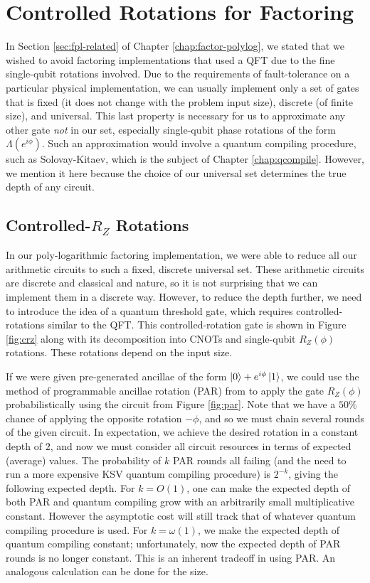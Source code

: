 \section{Controlled Rotations for Factoring}
\label{sec:fsl-qcompile}

In Section \ref{sec:fpl-related} of Chapter \ref{chap:factor-polylog}, we stated that we wished to avoid
factoring implementations that used a QFT due to the fine
single-qubit rotations involved. Due to the requirements of
fault-tolerance on a particular physical implementation,
we can usually implement only a set of gates that is fixed
(it does not change with the problem input size), discrete (of finite size),
and universal. This last property is necessary for us to approximate any
other gate \emph{not} in our set, especially single-qubit phase rotations
of the form $\Lambda(e^{i \phi})$. Such an approximation would involve
a quantum compiling procedure, such as Solovay-Kitaev, which is the
subject of Chapter \ref{chap:qcompile}. However, we mention it here
because the choice of our universal set determines the true depth
of any circuit.

\subsection{Controlled-$R_Z$ Rotations}

In our poly-logarithmic factoring implementation, we were able to reduce
all our arithmetic circuits to such a fixed, discrete universal set.
These arithmetic circuits are discrete and classical and nature, so it is
not surprising that we can implement them in a discrete way.
However, to reduce the depth further, we need to introduce the idea of
a quantum threshold gate, which requires controlled-rotations similar to
the QFT. This controlled-rotation gate is shown in Figure \ref{fig:crz}
along with its decomposition into CNOTs and single-qubit $R_Z(\phi)$
rotations.
These rotations depend on the input size.

If we were given pre-generated ancillae of the form
$\left\vert{0}\right\rangle + e^{i\phi}\left\vert{1}\right\rangle$, we could use the method of programmable ancillae rotation (PAR) from
\cite{Jones2012}
to apply the gate $R_Z(\phi)$ probabilistically
using the circuit from Figure \ref{fig:par}. Note that we have a $50\%$
chance
of applying the opposite rotation $-\phi$, and so we must chain
several rounds of the given circuit. In expectation, we achieve the
desired rotation in a constant depth of $2$, and now we must consider
all circuit resources in terms of expected (average) values. The 
probability of $k$ PAR rounds all failing (and the need to run a
more expensive KSV quantum compiling procedure) is $2^{-k}$, giving
the following expected depth. For $k = O(1)$, one can make the
expected depth of both PAR and quantum compiling grow with an arbitrarily small multiplicative constant.
However the asymptotic cost will still track that of whatever
quantum compiling procedure is used. For $k = \omega(1)$, we make
the expected depth of quantum compiling constant; unfortunately, now
the expected depth of PAR rounds is no longer constant. This is an
inherent tradeoff in using PAR.
An analogous calculation can be done
for the size.

